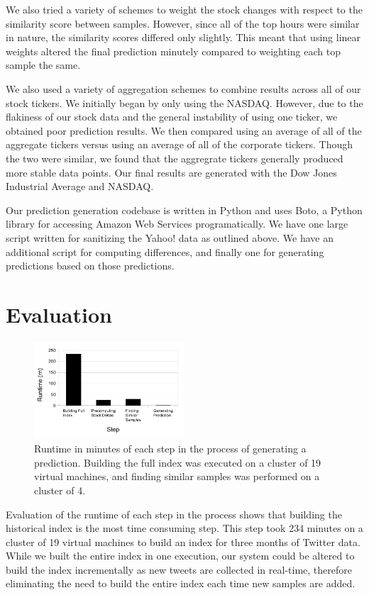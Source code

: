 \documentclass[twocolumn]{article}
\begin{document}
We also tried a variety of schemes to weight the stock changes with respect to the similarity score between samples. However, since all of the top hours were similar in nature, the similarity scores differed only slightly. This meant that using linear weights altered the final prediction minutely compared to weighting each top sample the same. 

We also used a variety of aggregation schemes to combine results across all of our stock tickers. We initially began by only using the NASDAQ. However, due to the flakiness of our stock data and the general instability of using one ticker, we obtained poor prediction results. We then compared using an average of all of the aggregate tickers versus using an average of all of the corporate tickers. Though the two were similar, we found that the aggregrate tickers generally produced more stable data points. Our final results are generated with the Dow Jones Industrial Average and NASDAQ.

Our prediction generation codebase is written in Python and uses Boto, a Python library for accessing Amazon Web Services programatically. We have one large script written for sanitizing the Yahoo! data as outlined above. We have an additional script for computing differences, and finally one for generating predictions based on those predictions. 

\section{Evaluation}

\begin{figure}
\centering
\includegraphics[width=0.5\textwidth]{runtime}
\caption{Runtime in minutes of each step in the process of generating a prediction. Building the full index was executed on a cluster of 19 virtual machines, and finding similar samples was performed on a cluster of 4.}
\label{runtime}
\end{figure}

Evaluation of the runtime of each step in the process shows that building the historical index is the most time consuming step. This step took 234 minutes on a cluster of 19 virtual machines to build an index for three months of Twitter data. While we built the entire index in one execution, our system could be altered to build the index incrementally as new tweets are collected in real-time, therefore eliminating the need to build the entire index each time new samples are added.
\end{document}
